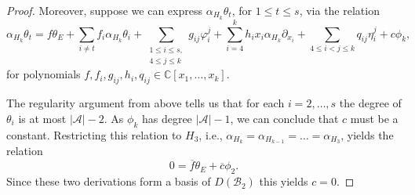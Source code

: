 \documentclass[10pt,a4paper]{amsart}
\def\A{{\mathcal{A}}}%
\def\B{{\mathcal{B}}}%
\begin{document}
\begin{proof}
Moreover, suppose we can express $\alpha_{H_k}\theta_t$, for $1\le t \le s$, via the relation
\begin{equation}\label{eq:relation}
	\alpha_{H_k}\theta_t=f \theta_E+\sum_{i\neq t} f_i \alpha_{H_k} \theta_i+
	\sum_{\substack{1\le i \le s, \\4\le j \le k}}g_{ij} \varphi_i^j+\sum_{i=4}^k h_{i} x_i\alpha_{H_k} \partial_{x_i}+
	\sum_{4\le i < j \le k} q_{ij}\eta_i^j+
	c \phi_k,
\end{equation}
for polynomials $f, f_i, g_{ij},h_i,q_{ij}\in \mathbb{C}[x_1,\ldots,x_k]$.

The regularity argument from above tells us that for each $i=2,\ldots,s$ the degree of $\theta_i$ is at most $|\A|-2$.
As $\phi_k$ has degree $|\A|-1$, we can conclude that $c$ must be a constant.
Restricting this relation to $H_3$, i.e., $\alpha_{H_k}=\alpha_{H_{k-1}}=\dots = \alpha_{H_{3}}$, yields the relation
\[
0 = \overline{f} \theta_E + \overline{c} \phi_2.
\]
Since these two derivations form a basis of $D(\B_2)$ this yields $c=0$.



\end{proof}
\end{document}
